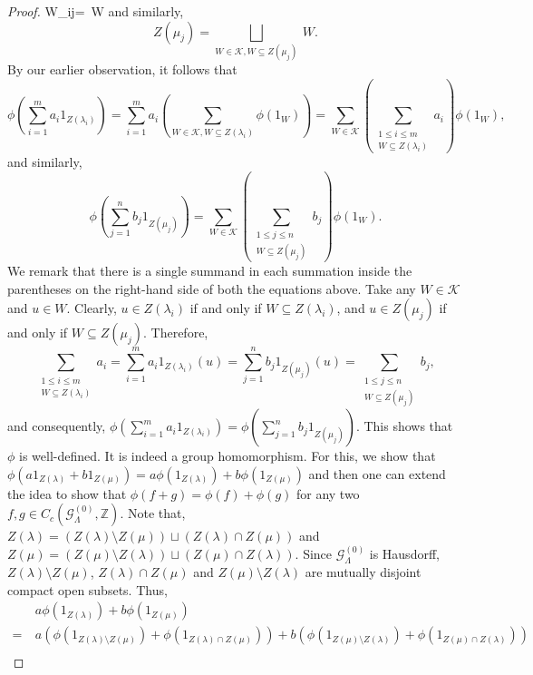 \documentclass[12pt]{amsart}
\theoremstyle{definition}
\theoremstyle{remark}
\begin{document}
\begin{proof}
W_{ij}=~W\] and similarly, \[Z(\mu_j)=\displaystyle{\bigsqcup_{W\in \mathcal{K},W\subseteq Z(\mu_j)}}~W.\] By our earlier observation, it follows that \[\phi\left(\displaystyle{\sum_{i=1}^{m}}a_i1_{Z(\lambda_i)}\right)=\displaystyle{\sum_{i=1}^{m}}a_i\left(\displaystyle{\sum_{W\in \mathcal{K},W\subseteq Z(\lambda_i)}}\phi(1_W)\right)=\displaystyle{\sum_{W\in \mathcal{K}}}\left(\displaystyle{\sum_{\substack{1\le i\le m\\W\subseteq Z(\lambda_i)}}}a_i\right)\phi(1_W),\] and similarly, \[\phi\left(\displaystyle{\sum_{j=1}^{n}}b_j 1_{Z(\mu_j)}\right)=\displaystyle{\sum_{W\in \mathcal{K}}}\left(\displaystyle{\sum_{\substack{1\le j\le n\\W\subseteq Z(\mu_j)}}}b_j\right)\phi(1_W).\] We remark that there is a single summand in each summation inside the parentheses on the right-hand side of both the equations above. Take any $W\in \mathcal{K}$ and $u\in W$. Clearly, $u\in Z(\lambda_i)$ if and only if $W\subseteq Z(\lambda_i)$, and $u\in Z(\mu_j)$ if and only if $W\subseteq Z(\mu_j)$. Therefore, \[\displaystyle{\sum_{\substack{1\le i\le m\\W\subseteq Z(\lambda_i)}}}a_i=\displaystyle{\sum_{i=1}^{m}}a_i 1_{Z(\lambda_i)}(u)=\displaystyle{\sum_{j=1}^{n}}b_j 1_{Z(\mu_j)}(u)=\displaystyle{\sum_{\substack{1\le j\le n\\W\subseteq Z(\mu_j)}}} b_j,\] and consequently, $\phi\left(\displaystyle{\sum_{i=1}^{m}}a_i 1_{Z(\lambda_i)}\right)=\phi\left(\displaystyle{\sum_{j=1}^{n}}b_j 1_{Z(\mu_j)}\right)$. This shows that $\phi$ is well-defined. It is indeed a group homomorphism. For this, we show that $\phi(a 1_{Z(\lambda)}+b 1_{Z(\mu)})=a\phi(1_{Z(\lambda)})+b\phi(1_{Z(\mu)})$ and then one can extend the idea to show that $\phi(f+g)=\phi(f)+\phi(g)$ for any two $f,g\in C_c(\mathcal{G}_\Lambda^{(0)},\mathbb{Z})$. Note that, $Z(\lambda)=(Z(\lambda)\setminus Z(\mu))\sqcup (Z(\lambda)\cap Z(\mu))$ and $Z(\mu)=(Z(\mu)\setminus Z(\lambda))\sqcup (Z(\mu)\cap Z(\lambda))$. Since $\mathcal{G}_\Lambda^{(0)}$ is Hausdorff, $Z(\lambda)\setminus Z(\mu)$, $Z(\lambda)\cap Z(\mu)$ and $Z(\mu)\setminus Z(\lambda)$ are mutually disjoint compact open subsets. Thus, 
\begin{align*}
&~ a\phi(1_{Z(\lambda)})+b\phi(1_{Z(\mu)})\\
= &~a\left(\phi(1_{Z(\lambda)\setminus Z(\mu)})+\phi(1_{Z(\lambda)\cap Z(\mu)})\right)+b\left(\phi(1_{Z(\mu)\setminus Z(\lambda)})+\phi(1_{Z(\mu)\cap Z(\lambda)})\right)\\

\end{align*}
\end{proof}
\end{document}
